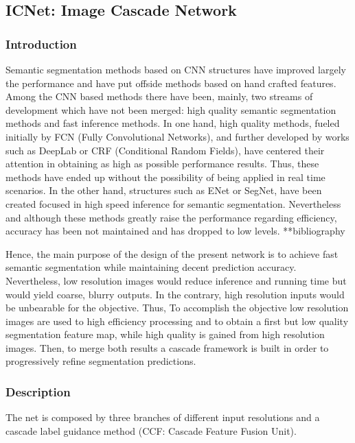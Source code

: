 \documentclass[12pt,a4paper]{article}
\begin{document}
\subsection{ICNet: Image Cascade Network}

\subsubsection{Introduction}

Semantic segmentation methods based on CNN structures have improved largely the performance and have put offside methods based on hand crafted features. Among the CNN based methods there have been, mainly, two streams of development which have not been merged: high quality semantic segmentation methods and fast inference methods. In one hand, high quality methods, fueled initially by FCN (Fully Convolutional Networks), and further developed by works such as DeepLab or CRF (Conditional Random Fields), have centered their attention in obtaining as high as possible performance results. Thus, these methods have ended up without the possibility of being applied in real time scenarios. In the other hand, structures such as ENet or SegNet, have been created focused in high speed inference for semantic segmentation. Nevertheless and although these methods greatly raise the performance regarding efficiency, accuracy has been not maintained and has dropped to low levels. **bibliography\newline

Hence, the main purpose of the design of the present network is to achieve fast semantic segmentation while maintaining decent prediction accuracy. Nevertheless, low resolution images would reduce inference and running time but would yield coarse, blurry outputs. In the contrary, high resolution inputs would be unbearable for the objective. Thus, To accomplish the objective low resolution images are used to high efficiency processing and to obtain a first but low quality segmentation feature map, while high quality is gained from high resolution images. Then, to merge both results a cascade framework is built in order to progressively refine segmentation predictions.

\subsubsection{Description}

The net is composed by three branches of different input resolutions and a cascade label guidance method (CCF: Cascade Feature Fusion Unit).\newline
\end{document}

